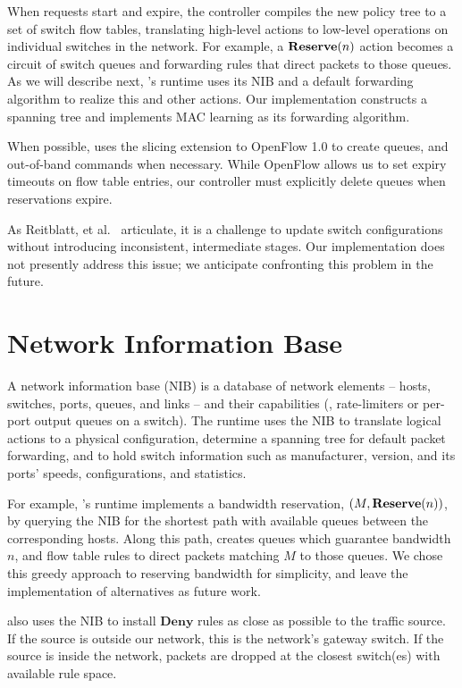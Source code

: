 When requests start and expire, the \sys controller compiles the new
policy tree to a set of switch flow tables, translating
high-level actions to low-level operations on individual
switches in the network. For example, a $\textbf{Reserve}(n)$ action
becomes a circuit of switch queues and forwarding rules that direct
packets to those queues.  As we will describe next, \sys's runtime
uses its NIB and a default forwarding algorithm to realize this and
other actions.  Our implementation constructs a spanning tree and
implements MAC learning as its forwarding algorithm.

When possible, \sys uses the slicing extension to OpenFlow 1.0 to
create queues, and out-of-band commands when necessary.  While
OpenFlow allows us to set expiry timeouts on flow table entries, our
controller must explicitly delete queues when reservations expire.

As Reitblatt, et al.~\cite{reitblatt12consistent} articulate, it is
a challenge to update switch configurations without introducing
inconsistent, intermediate stages. Our implementation does not
presently address this issue; we anticipate confronting this
problem in the future.

\section{Network Information Base}
\label{sec:NIB}

A network information base (NIB) is a database of network elements
-- hosts, switches, ports, queues, and links -- and their
capabilities (\eg, rate-limiters or per-port output queues on a
switch). The runtime uses the NIB to translate logical actions to a
physical configuration, determine a spanning tree for default packet
forwarding, and to hold switch information such as manufacturer,
version, and its ports' speeds, configurations, and statistics.

For example, \sys's runtime implements a bandwidth reservation,
$(M,\textbf{Reserve}(n))$, by querying the NIB for the shortest path
with available queues between the corresponding hosts.  Along this
path, \sys creates queues which guarantee bandwidth $n$, and flow
table rules to direct packets matching $M$ to those queues. We chose
this greedy approach to reserving bandwidth for simplicity, and
leave the implementation of alternatives as future work.

\sys also uses the NIB to install $\textbf{Deny}$ rules as close as
possible to the traffic source. If the source is outside our
network, this is the network's gateway switch. If the source is
inside the network, packets are dropped at the closest switch(es)
with available rule space.

